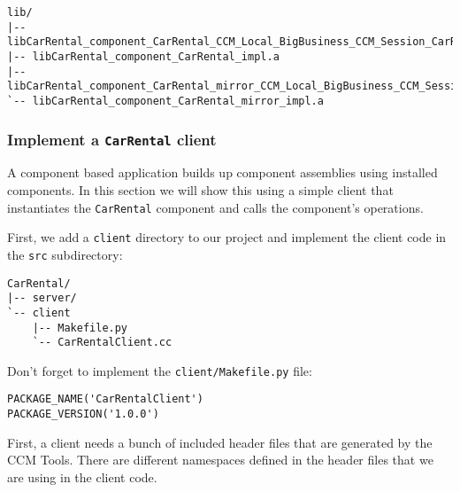 \begin{tiny}
\begin{verbatim}
lib/
|-- libCarRental_component_CarRental_CCM_Local_BigBusiness_CCM_Session_CarRental.a
|-- libCarRental_component_CarRental_impl.a
|-- libCarRental_component_CarRental_mirror_CCM_Local_BigBusiness_CCM_Session_CarRental_mirror.a
`-- libCarRental_component_CarRental_mirror_impl.a
\end{verbatim}
\end{tiny}


\subsubsection{Implement a {\tt CarRental} client}

A component based application builds up component assemblies using installed
components. In this section we will show this using a simple client that
instantiates the {\tt CarRental} component and calls the component's operations.

First, we add a {\tt client} directory to our project and implement
the client code in the {\tt src} subdirectory:
\begin{small}
\begin{verbatim}
CarRental/
|-- server/
`-- client
    |-- Makefile.py
    `-- CarRentalClient.cc
\end{verbatim}
\end{small}

Don't forget to implement the {\tt client/Makefile.py} file:
\begin{small}
\begin{verbatim}
PACKAGE_NAME('CarRentalClient')
PACKAGE_VERSION('1.0.0')
\end{verbatim}
\end{small}

First, a client needs a bunch of included header files that are generated by 
the CCM Tools.
There are different namespaces defined in the header files that we are using 
in the client code.

